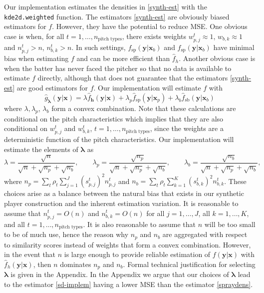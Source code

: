 \documentclass[12pt]{article}
\newcommand{\y}{\textbf{y}}
\newcommand{\x}{\textbf{x}}
\newcommand{\h}{\textbf{h}}
\newcommand{\lambdabf}{\boldsymbol{\lambda}}
\begin{document}
Our implementation estimates the densities in \eqref{synth-est} with the \texttt{kde2d.weighted} function. The estimators \eqref{synth-est} are obviously biased estimators for $f$. However, they have the potential to reduce MSE. One obvious case is when, for all 
$t = 1,\ldots,n_{\text{pitch types}}$, there exists weights 
$w_{p,j}^t \approx 1$, $w_{b,k} \approx 1$ and 
$n_{p,j}^t > n$, $n_{b,k}^t > n$. 
In such settings, $f_{\text{sp}}(\y|\x_b)$ and $f_{\text{sp}}(\y|\x_b)$ have minimal bias when estimating $f$ and can be more efficient than $\hat f_h$. Another obvious case is when the batter has never faced the pitcher so that no data is available to estimate $f$ directly, although that does not guarantee that the estimators \eqref{synth-est} are good estimators for $f$. Our implementation will estimate $f$ with
\begin{equation} \label{sd-implem}
  \hat{g}_{\lambdabf}(\y|\x) = \lambda \hat f_\h(\y|\x) 
    + \lambda_p \hat f_{\text{sp}}(\y|\x_p) 
    + \lambda_b \hat f_{\text{sb}}(\y|\x_b)
\end{equation}
where $\lambda,\lambda_p$, $\lambda_b$ form a convex combination. %
Note that these calculations are conditional on the pitch characteristics which implies that they are also conditional on $w_{p,j}^t$ and $w_{b,k}^t$, $t = 1,\ldots,n_{\text{pitch types}}$, since the weights are a deterministic function of the pitch characteristics. Our implementation will estimate the elements of $\lambdabf$ as 
$$
  \lambda = \frac{\sqrt{n}}{\sqrt{n} + \sqrt{n_p} + \sqrt{n_b}}, \qquad
  \lambda_p = \frac{\sqrt{n_p}}{\sqrt{n} + \sqrt{n_p} + \sqrt{n_b}}, \qquad
  \lambda_b = \frac{\sqrt{n_b}}{\sqrt{n} + \sqrt{n_p} + \sqrt{n_b}},
$$
where $n_p = \sum_t\rho_t\sum_{j=1}^J (s_{p,j}^t)^2n_{p,j}^t$ and 
$n_b = \sum_t\rho_t\sum_{k=1}^K (s_{b,k}^t)^2n_{b,k}^t$.  These choices arise as a balance between the natural bias that exists in our synthetic player construction and the inherent estimation variation. %
It is reasonable to assume that $n_{p,j}^t = O(n)$ and $n_{b,k}^t = O(n)$ for all $j = 1,\ldots,J$, all $k = 1,\ldots,K$, and all $t = 1,\ldots,n_{\text{pitch types}}$. It is also reasonable to assume that $n$ will be too small to be of much use, hence the reason why $n_p$ and $n_b$ are aggregated with respect to similarity scores instead of weights that form a convex combination. However, in the event that $n$ is large enough to provide reliable estimation of $f(\y|\x)$ with $\hat f_h(\y|\x)$, then $n$ dominates $n_p$ and $n_b$. Formal technical justification for selecting $\lambdabf$ is given in the Appendix. In the Appendix we argue that our choices of $\lambdabf$ lead to the estimator \eqref{sd-implem} having a lower MSE than the estimator \eqref{spraydens}.
\end{document}

